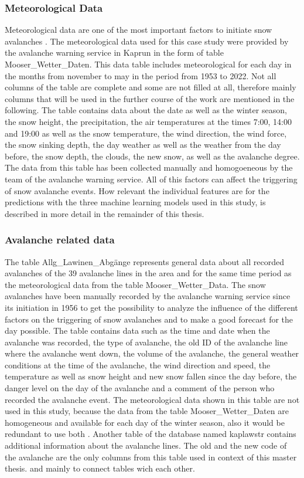 \documentclass[../masterarbeit.tex]{subfiles}
\begin{document}
 


\subsubsection{Meteorological Data}
Meteorological data are one of the most important factors to initiate snow avalanches \textcite[]{Bahram:2019}. The meteorological data used for this case study were provided by the avalanche warning service in Kaprun in the form of table Mooser\_Wetter\_Daten.
This data table includes meteorological for each day in the months from november to may in the period from 1953 to 2022. Not all columns of the table are complete and some are not filled at all, therefore mainly columns that will be used in the further course of the work are mentioned in the following. The table contains data about the date as well as the winter season, the snow height, the precipitation, the air temperatures at the times 7:00, 14:00 and 19:00 as well as the snow temperature, the wind direction, the wind force, the snow sinking depth, the day weather as well as the weather from the day before, the snow depth, the clouds, the new snow, as well as the avalanche degree. The data from this table has been collected manually and homogoeneous by the team of the avalanche warning service. All of this factors can affect the triggering of snow avalanche events. How relevant the individual features are for the predictions with the three machine learning models used in this study, is described in more detail in the remainder of this thesis.



\subsubsection{Avalanche related data}
The table Allg\_Lawinen\_Abgänge represents general data about all recorded avalanches of the 39 avalanche lines in the area and for the same time period as the meteorological data from the table Mooser\_Wetter\_Data. The snow avalanches have been manually recorded by the avalanche warning service since its initiation in 1956 to get the possibility to analyze the influence of the different factors on the triggering of snow avalanches and to make a good forecast for the day possible. The table contains data such as the time and date when the avalanche was recorded, the type of avalanche, the old ID of the avalanche line where the avalanche went down, the volume of the avalanche, the general weather conditions at the time of the avalanche, the wind direction and speed, the temperature as well as snow height and new snow fallen since the day before, the danger level on the day of the avalanche and a comment of the person who recorded the avalanche event. The meteorological data shown in this table are not used in this study, because the data from the table Mooser\_Wetter\_Daten are homogeneous and available for each day of the winter season, also it would be redundant to use both .
Another table of the database named kaplawstr contains additional information about the avalanche lines. The old and the new code of the avalanche are the only columns from this table used in context of this master thesis. and mainly to connect tables wich each other.
\end{document}
